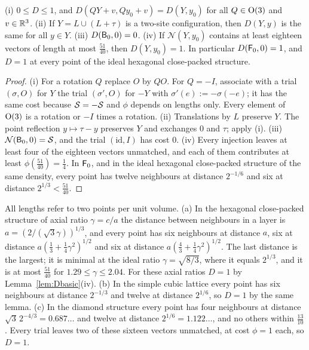\begin{lemma}\label{lem:Dbasic}
\textup{(i)} $0\le D\le1$, and $D(QY+v,Qy_0+v)=D(Y,y_0)$ for all $Q\in\mathrm{O}(3)$ and $v\in\mathbb R^3$.
\textup{(ii)} If $Y=L\cup(L+\tau)$ is a two-site configuration, then $D(Y,y)$ is the same for all $y\in Y$.
\textup{(iii)} $D(\mathsf B_0,0)=0$.
\textup{(iv)} If $\mathcal N(Y,y_0)$ contains at least eighteen vectors of length at most $\frac{51}{40}$, then $D(Y,y_0)=1$. In
particular $D(\mathsf F_0,0)=1$, and $D=1$ at every point of the ideal hexagonal close-packed structure.
\end{lemma}

\begin{proof}
(i) For a rotation $Q$ replace $O$ by $QO$. For $Q=-I$, associate with a trial $(\sigma,O)$ for $Y$ the trial $(\sigma',O)$ for $-Y$
with $\sigma'(e):=-\sigma(-e)$; it has the same cost because $\mathcal S=-\mathcal S$ and $\phi$ depends on lengths only. Every element of
$\mathrm{O}(3)$ is a rotation or $-I$ times a rotation.
(ii) Translations by $L$ preserve $Y$. The point reflection $y\mapsto\tau-y$ preserves $Y$ and exchanges $0$ and $\tau$; apply (i).
(iii) $\mathcal N(\mathsf B_0,0)=\mathcal S$, and the trial $(\mathrm{id},I)$ has cost $0$.
(iv) Every injection leaves at least four of the eighteen vectors unmatched, and each of them contributes at least
$\phi(\frac{51}{40})=\frac14$. In $\mathsf F_0$, and in the ideal hexagonal close-packed structure of the same density, every point has twelve
neighbours at distance $2^{-1/6}$ and six at distance $2^{1/3}<\frac{51}{40}$.
\end{proof}

\begin{remark}[Further examples with $D=1$]\label{rem:examples}
All lengths refer to two points per unit volume. \textup{(a)} In the hexagonal close-packed structure of axial ratio $\gamma=c/a$ the
distance between neighbours in a layer is $a=(2/(\sqrt3\gamma))^{1/3}$, and every point has six neighbours at distance $a$, six at
distance $a(\frac13+\frac14\gamma^2)^{1/2}$ and six at distance $a(\frac43+\frac14\gamma^2)^{1/2}$. The last distance is the largest;
it is minimal at the ideal ratio $\gamma=\sqrt{8/3}$, where it equals $2^{1/3}$, and it is at most $\frac{51}{40}$ for
$1.29\le\gamma\le2.04$. For these axial ratios $D=1$ by Lemma~\ref{lem:Dbasic}(iv). \textup{(b)} In the simple cubic lattice every
point has six neighbours at distance $2^{-1/3}$ and twelve at distance $2^{1/6}$, so $D=1$ by the same lemma. \textup{(c)} In the
diamond structure every point has four neighbours at distance $\sqrt3\,2^{-4/3}=0.687\ldots$ and twelve at distance
$2^{1/6}=1.122\ldots$, and no others within $\frac{13}{10}$. Every trial leaves two of these sixteen vectors unmatched, at cost
$\phi=1$ each, so $D=1$.
\end{remark}

